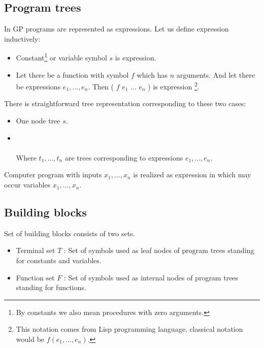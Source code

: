 \documentclass[12pt,a4paper]{report}
\newcommand{\Lets}{Let us\xspace}
\begin{document}
\subsection{Program trees}

In GP programs are represented as expressions. \Lets define expression inductively:

\begin{itemize}
	\item Constant\footnote{By constants we also mean procedures with zero  	
		  arguments.} or variable symbol $s$ is expression.
	\item Let there be a function with symbol $f$ which has $n$ arguments. 
	      And let there be expressions $e_{1}, ..., e_{n}$. 
	      Then ( $f$ $e_{1}$ ... $e_{n}$ ) is expression
	      \footnote{This notation comes from Lisp programming language, 
	      classical notation would be $f(e_{1}, ... ,e_{n})$. }.   
\end{itemize}

There is straightforward tree representation corresponding to these two cases:

\begin{itemize}
	\item One node tree $s$.
    \item {}\\\\
		 Where $t_{1}, ..., t_{n}$ are trees corresponding to expressions $e_{1}, ..., e_{n}$.	   
\end{itemize}

Computer program with inputs $x_{1}, ..., x_{n}$ is realized as expression in which 
may occur variables $x_{1}, ..., x_{n}$.

\subsection{Building blocks}

Set of building blocks consists of two sets.

\begin{itemize}
	\item Terminal set $T$ : Set of symbols used as leaf nodes of 	               
	      program trees standing for constants and variables.
	\item Function set $F$ : Set of symbols used as internal nodes 
	      of program trees standing for functions.
\end{itemize}
\end{document}
